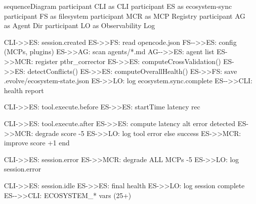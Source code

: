 \documentclass[
  12pt,
]{article}
\newenvironment{Shaded}{}{}
\newcommand{\NormalTok}[1]{#1}
\begin{document}
\begin{Shaded}
\begin{Highlighting}[]
\NormalTok{sequenceDiagram}
\NormalTok{participant CLI as CLI}
\NormalTok{participant ES as ecosystem{-}sync}
\NormalTok{participant FS as filesystem}
\NormalTok{participant MCR as MCP Registry}
\NormalTok{participant AG as Agent Dir}
\NormalTok{participant LO as Observability Log}

\NormalTok{CLI{-}\textgreater{}\textgreater{}ES: session.created}
\NormalTok{ES{-}\textgreater{}\textgreater{}FS: read opencode.json}
\NormalTok{FS{-}{-}\textgreater{}\textgreater{}ES: config (MCPs, plugins)}
\NormalTok{ES{-}\textgreater{}\textgreater{}AG: scan agents/*.md}
\NormalTok{AG{-}{-}\textgreater{}\textgreater{}ES: agent list}
\NormalTok{ES{-}\textgreater{}\textgreater{}MCR: register ptbr\_corrector}
\NormalTok{ES{-}\textgreater{}\textgreater{}ES: computeCrossValidation()}
\NormalTok{ES{-}\textgreater{}\textgreater{}ES: detectConflicts()}
\NormalTok{ES{-}\textgreater{}\textgreater{}ES: computeOverallHealth()}
\NormalTok{ES{-}\textgreater{}\textgreater{}FS: save .evolve/ecosystem{-}state.json}
\NormalTok{ES{-}\textgreater{}\textgreater{}LO: log ecosystem.sync.complete}
\NormalTok{ES{-}{-}\textgreater{}\textgreater{}CLI: health report}

\NormalTok{CLI{-}\textgreater{}\textgreater{}ES: tool.execute.before}
\NormalTok{ES{-}\textgreater{}\textgreater{}ES: startTime latency rec}

\NormalTok{CLI{-}\textgreater{}\textgreater{}ES: tool.execute.after}
\NormalTok{ES{-}\textgreater{}\textgreater{}ES: compute latency}
\NormalTok{alt error detected}
\NormalTok{    ES{-}\textgreater{}\textgreater{}MCR: degrade score {-}5}
\NormalTok{    ES{-}\textgreater{}\textgreater{}LO: log tool error}
\NormalTok{else success}
\NormalTok{    ES{-}\textgreater{}\textgreater{}MCR: improve score +1}
\NormalTok{end}

\NormalTok{CLI{-}\textgreater{}\textgreater{}ES: session.error}
\NormalTok{ES{-}\textgreater{}\textgreater{}MCR: degrade ALL MCPs {-}5}
\NormalTok{ES{-}\textgreater{}\textgreater{}LO: log session.error}

\NormalTok{CLI{-}\textgreater{}\textgreater{}ES: session.idle}
\NormalTok{ES{-}\textgreater{}\textgreater{}ES: final health}
\NormalTok{ES{-}\textgreater{}\textgreater{}LO: log session complete}
\NormalTok{ES{-}{-}\textgreater{}\textgreater{}CLI: ECOSYSTEM\_* vars (25+)}
\end{Highlighting}
\end{Shaded}
\end{document}
